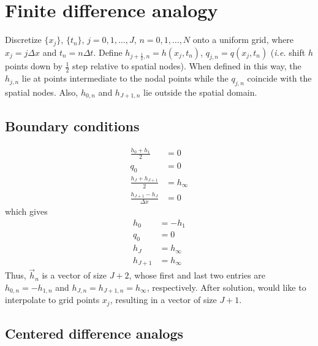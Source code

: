 \documentclass[12pt]{article}
\numberwithin{equation}{section}
\begin{document}
\section{Finite difference analogy}

Discretize $\{ x_j \}$, $\{t_n\}$, $j = 0, 1, \dots, J$, $n = 0, 1, \dots, N$ onto a uniform grid, where $x_j = j \Delta x$ and $t_n = n \Delta t$. Define $h_{j+\frac{1}{2},n}=h(x_j,t_n)$, $q_{j,n} = q(x_j, t_n)$ ({\it i.e.} shift $h$ points down by $\frac{1}{2}$ step relative to spatial nodes). When defined in this way, the $h_{j,n}$ lie at points intermediate to the nodal points while the $q_{j,n}$ coincide with the spatial nodes. Also, $h_{0,n}$ and $h_{J+1,n}$ lie outside the spatial domain.

\subsection{Boundary conditions}

\begin{align}
	\frac{h_0 + h_1}{2} &= 0
	\\
	q_0 &= 0
	\\
	\frac{h_J + h_{J+1}}{2} &= h_\infty
	\\
	\frac{h_{J+1} - h_{J}}{\Delta x} &=0
\end{align}
which gives
\begin{align}
	h_0 &= -h_1
	\\
	q_0 &= 0
	\\
	h_J &= h_\infty
	\\
	h_{J+1}&=h_\infty
\end{align}
Thus, $\vec{h}_n$ is a vector of size $J+2$, whose first and last two entries are $h_{0,n} = -h_{1,n}$ and $h_{J,n} = h_{J+1,n} = h_\infty$, respectively. After solution, would like to interpolate to grid points $x_j$, resulting in a vector of size $J+1$.



\subsection{Centered difference analogs}
\end{document}
